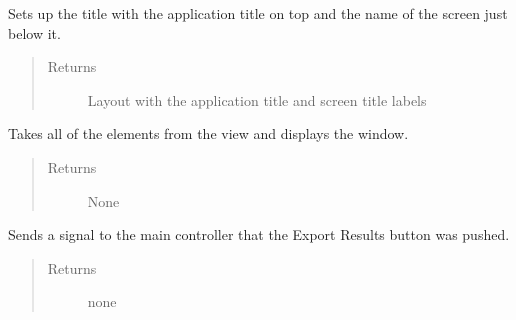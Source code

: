 \documentclass[letterpaper,10pt,english]{sphinxmanual}
\begin{document}
\begin{fulllineitems}
\begin{fulllineitems}
\begin{quote}
\begin{description}
\end{description}\end{quote}

\end{fulllineitems}


\begin{fulllineitems}
\label{\detokenize{index:src.Views.View_ReportScreen.ReportWindow.setupTitle}}
Sets up the title with the application title on top and the name of the screen just below it.
\begin{quote}\begin{description}
\item[{Returns}] \leavevmode
Layout with the application title and screen title labels

\end{description}\end{quote}

\end{fulllineitems}


\begin{fulllineitems}
\label{\detokenize{index:src.Views.View_ReportScreen.ReportWindow.showWindow}}
Takes all of the elements from the view and displays the window.
\begin{quote}\begin{description}
\item[{Returns}] \leavevmode
None

\end{description}\end{quote}

\end{fulllineitems}


\begin{fulllineitems}
\label{\detokenize{index:src.Views.View_ReportScreen.ReportWindow.signalExportResults}}
Sends a signal to the main controller that the Export Results button was pushed.
\begin{quote}\begin{description}
\item[{Returns}] \leavevmode
none


\end{description}
\end{quote}
\end{fulllineitems}
\end{fulllineitems}
\end{document}
